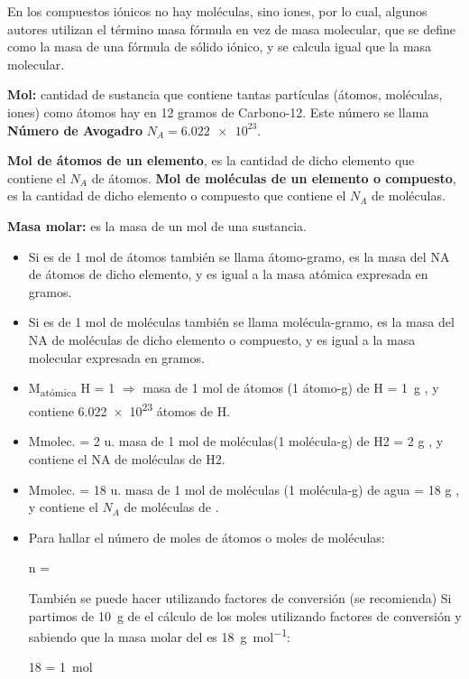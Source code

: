 En los compuestos iónicos no hay moléculas, sino iones, por lo cual, algunos autores utilizan el término masa fórmula en vez de masa molecular, que se define como la masa de una fórmula de sólido iónico, y se calcula igual que la masa molecular.

\textbf{Mol:} cantidad de sustancia que contiene tantas partículas (átomos, moléculas, iones) como átomos hay en 12 gramos de Carbono-12.
Este número se llama \textbf{Número de Avogadro}  \( N_A = \num{6.022e23} \).

\textbf{ Mol de átomos de un elemento}, es la cantidad de dicho elemento que contiene el \( N_A \) de átomos.
\textbf{Mol de moléculas de un elemento o compuesto}, es la cantidad de dicho elemento o compuesto que contiene el \( N_A \) de moléculas.

\textbf{Masa molar:} es la masa de un mol de una sustancia.
\begin{itemize}
    \item Si es de 1 mol de átomos también se llama átomo-gramo, es la masa del NA de átomos de dicho elemento, y es igual a la masa atómica expresada en gramos.
    \item Si es de 1 mol de moléculas también se llama molécula-gramo, es la masa del NA de moléculas de dicho elemento o compuesto, y es igual a la masa molecular expresada en gramos.
\end{itemize}


\begin{itemize}
    \item M\textsubscript{atómica} H = \qty{1}{\uma} \( \Rightarrow \) masa de 1 mol de átomos (1 átomo-g) de H = \qty{1}{\g} , y contiene \num{6.022e23} átomos de H.
    \item Mmolec.  = 2 u. masa de 1 mol de moléculas(1 molécula-g) de H2 = 2 g , y contiene el NA de moléculas de H2.
    \item Mmolec.  = 18 u. masa de 1 mol de moléculas (1 molécula-g) de agua = 18 g , y contiene el \( N_A \) de moléculas de .
    \item Para hallar el número de moles de átomos o moles de moléculas:
    \begin{centeredequation}
        n = 
    \end{centeredequation}
    También se puede hacer utilizando factores de conversión (se recomienda)
    Si partimos de \qty{10}{\g} de  el cálculo de los moles utilizando factores de conversión y sabiendo que la masa molar del  es \qty{18}{\g\per\mol}:
    \begin{centeredequation}
        18 \cancelred{\unit{\g}} \cdot {} = \qty{1}{\mol}
    \end{centeredequation}
\end{itemize}


